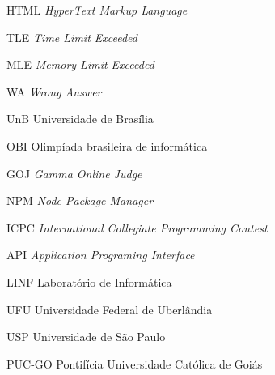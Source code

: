 \begin{siglas}
  \item[HTML] \textit{HyperText Markup Language}
  \item[TLE] \textit{Time Limit Exceeded}
  \item[MLE] \textit{Memory Limit Exceeded}
  \item[WA] \textit{Wrong Answer} 
  \item[UnB] Universidade de Brasília 
  \item[OBI] Olimpíada brasileira de informática
  \item[GOJ]\textit{Gamma Online Judge}
  \item[NPM] \textit{Node Package Manager}
  \item[ICPC] \textit{International Collegiate Programming Contest}
  \item[API] \textit{Application Programing Interface}
  \item[LINF] Laboratório de Informática
  \item[UFU] Universidade Federal de Uberlândia
  \item[USP] Universidade de São Paulo
  \item[PUC-GO] Pontifícia Universidade Católica de Goiás
\end{siglas}
